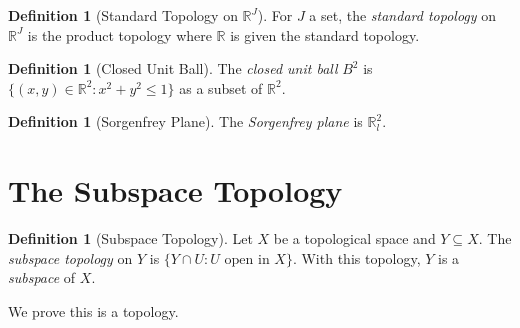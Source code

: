 \documentclass{report}
\theoremstyle{definition}
\newtheorem{df}[lm]{Definition}
\begin{document}
  \begin{df}[Standard Topology on $\mathbb{R}^J$]
    For $J$ a set, the \emph{standard topology} on $\mathbb{R}^J$ is the
    product topology where $\mathbb{R}$ is given the standard topology.
  \end{df}

  \begin{df}[Closed Unit Ball]
    The \emph{closed unit ball} $B^2$ is $\{ (x, y) \in \mathbb{R}^2 : x^2 +
    y^2 \leq 1 \}$ as a subset of $\mathbb{R}^2$.
  \end{df}

   \begin{df}[Sorgenfrey Plane]
   The \emph{Sorgenfrey plane} is $\mathbb{R}_l^2$.
 \end{df}

  \section{The Subspace Topology}

  \begin{df}[Subspace Topology]
    Let $X$ be a topological space and $Y \subseteq X$. The \emph{subspace
      topology} on $Y$ is $\{ Y \cap U : U \text{ open in } X \}$. With this
    topology, $Y$ is a \emph{subspace} of $X$.

    We prove this is a topology.
  \end{df}
\end{document}
